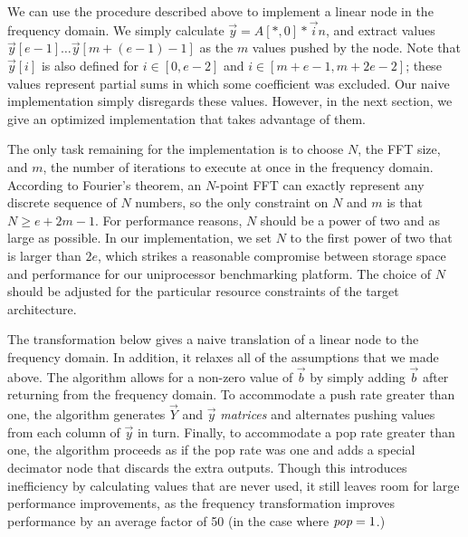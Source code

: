 We can use the procedure described above to implement a linear node in
the frequency domain.  We simply calculate ${\vec y} = A[*,0] * {\vec
in}$, and extract values ${\vec y}[e-1] \dots {\vec y}[m+(e-1)-1]$ as
the $m$ values pushed by the node.  Note that ${\vec y}[i]$ is also
defined for $i \in [0, e-2]$ and $i \in [m+e-1,m+2e-2]$; these values
represent partial sums in which some coefficient was excluded.  Our
naive implementation simply disregards these values.  However, in the
next section, we give an optimized implementation that takes advantage
of them.

The only task remaining for the implementation is to choose $N$, the
FFT size, and $m$, the number of iterations to execute at once in the
frequency domain.  According to Fourier's theorem, an $N$-point FFT
can exactly represent any discrete sequence of $N$ numbers, so the
only constraint on $N$ and $m$ is that $N \ge e+2m-1$.  For
performance reasons, $N$ should be a power of two and as large as
possible.  In our implementation, we set $N$ to the first power of two
that is larger than $2e$, which strikes a reasonable compromise
between storage space and performance for our uniprocessor
benchmarking platform.  The choice of $N$ should be adjusted for the
particular resource constraints of the target architecture.

The transformation below gives a naive translation of a linear node to
the frequency domain.  In addition, it relaxes all of the assumptions
that we made above.  The algorithm allows for a non-zero value of
${\vec b}$ by simply adding $\vec{b}$ after returning from the
frequency domain.  To accommodate a push rate greater than one, the
algorithm generates $\vec{Y}$ and $\vec{y}$ {\it matrices} and
alternates pushing values from each column of $\vec{y}$ in turn.
Finally, to accommodate a pop rate greater than one, the algorithm
proceeds as if the pop rate was one and adds a special decimator node
that discards the extra outputs.  Though this introduces inefficiency
by calculating values that are never used, it still leaves room for
large performance improvements, as the frequency transformation
improves performance by an average factor of 50 (in the case where
$\mbox{\it pop}=1$.)

